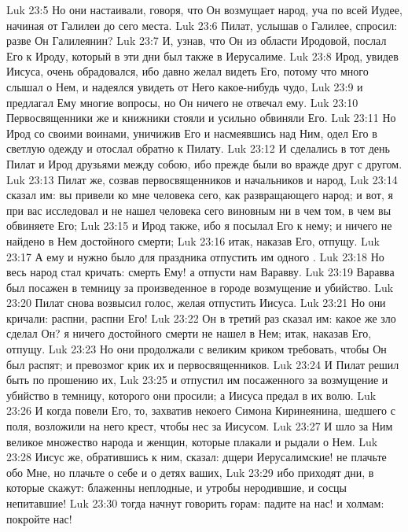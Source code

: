 \vs Luk 23:5 Но они настаивали, говоря, что Он возмущает народ, уча по всей Иудее, начиная от Галилеи до сего места.
\vs Luk 23:6 Пилат, услышав о Галилее, спросил: разве Он Галилеянин?
\vs Luk 23:7 И, узнав, что Он из области Иродовой, послал Его к Ироду, который в эти дни был также в Иерусалиме.
\vs Luk 23:8 Ирод, увидев Иисуса, очень обрадовался, ибо давно желал видеть Его, потому что много слышал о Нем, и надеялся увидеть от Него какое-нибудь чудо,
\vs Luk 23:9 и предлагал Ему многие вопросы, но Он ничего не отвечал ему.
\vs Luk 23:10 Первосвященники же и книжники стояли и усильно обвиняли Его.
\vs Luk 23:11 Но Ирод со своими воинами, уничижив Его и насмеявшись над Ним, одел Его в светлую одежду и отослал обратно к Пилату.
\vs Luk 23:12 И сделались в тот день Пилат и Ирод друзьями между собою, ибо прежде были во вражде друг с другом.
\vs Luk 23:13 Пилат же, созвав первосвященников и начальников и народ,
\vs Luk 23:14 сказал им: вы привели ко мне человека сего, как развращающего народ; и вот, я при вас исследовал и не нашел человека сего виновным ни в чем том, в чем вы обвиняете Его;
\vs Luk 23:15 и Ирод также, ибо я посылал Его к нему; и ничего не найдено в Нем достойного смерти;
\vs Luk 23:16 итак, наказав Его, отпущу.
\vs Luk 23:17 А ему и нужно было для праздника отпустить им одного .
\vs Luk 23:18 Но весь народ стал кричать: смерть Ему! а отпусти нам Варавву.
\vs Luk 23:19 Варавва был посажен в темницу за произведенное в городе возмущение и убийство.
\vs Luk 23:20 Пилат снова возвысил голос, желая отпустить Иисуса.
\vs Luk 23:21 Но они кричали: распни, распни Его!
\vs Luk 23:22 Он в третий раз сказал им: какое же зло сделал Он? я ничего достойного смерти не нашел в Нем; итак, наказав Его, отпущу.
\vs Luk 23:23 Но они продолжали с великим криком требовать, чтобы Он был распят; и превозмог крик их и первосвященников.
\vs Luk 23:24 И Пилат решил быть по прошению их,
\vs Luk 23:25 и отпустил им посаженного за возмущение и убийство в темницу, которого они просили; а Иисуса предал в их волю.
\rsbpar\vs Luk 23:26 И когда повели Его, то, захватив некоего Симона Киринеянина, шедшего с поля, возложили на него крест, чтобы нес за Иисусом.
\vs Luk 23:27 И шло за Ним великое множество народа и женщин, которые плакали и рыдали о Нем.
\vs Luk 23:28 Иисус же, обратившись к ним, сказал: дщери Иерусалимские! не плачьте обо Мне, но плачьте о себе и о детях ваших,
\vs Luk 23:29 ибо приходят дни, в которые скажут: блаженны неплодные, и утробы неродившие, и сосцы непитавшие!
\vs Luk 23:30 тогда начнут говорить горам: падите на нас! и холмам: покройте нас!
